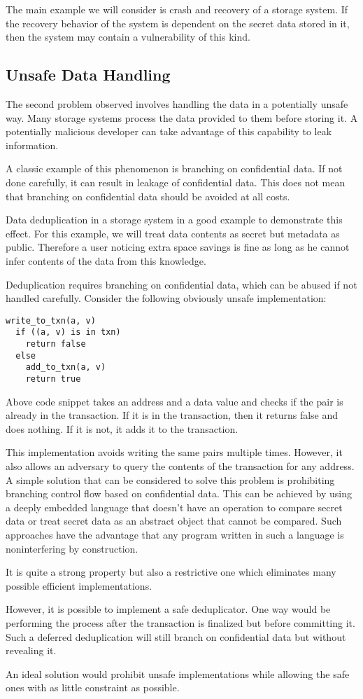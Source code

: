 The main example we will consider is crash and recovery of a storage system. If the recovery behavior of the system is dependent on the secret data stored in it, then the system may contain a vulnerability of this kind.


\subsection{Unsafe Data Handling}
The second problem observed involves handling the data in a potentially unsafe way. Many storage systems process the data provided to them before storing it. A potentially malicious developer can take advantage of this capability to leak information. 

A classic example of this phenomenon is branching on confidential data. If not done carefully, it can result in leakage of confidential data. This does not mean that branching on confidential data should be avoided at all costs. 

Data deduplication in a storage system in a good example to demonstrate this effect. For this example, we will treat data contents as secret but metadata as public. Therefore a user noticing extra space savings is fine as long as he cannot infer contents of the data from this knowledge. 

Deduplication requires branching on confidential data, which can be abused if not handled carefully. Consider the following obviously unsafe implementation: 

\begin{lstlisting}
write_to_txn(a, v)
  if ((a, v) is in txn)
    return false
  else
    add_to_txn(a, v)
    return true
\end{lstlisting}

Above code snippet takes an address and a data value and checks if the pair is already in the transaction. If it is in the transaction, then it returns false and does nothing. If it is not, it adds it to the transaction. 

This implementation avoids writing the same pairs multiple times. However, it also allows an adversary to query the contents of the transaction for any address. A simple solution that can be considered to solve this problem is prohibiting branching control flow based on confidential data. This can be achieved by using a deeply embedded language that doesn’t have an operation to compare secret data or treat secret data as an abstract object that cannot be compared. Such approaches have the advantage that any program written in such a language is noninterfering by construction. 

It is quite a strong property but also a restrictive one which eliminates many possible efficient implementations. 

However, it is possible to implement a safe deduplicator. One way would be performing the process after the transaction is finalized but before committing it. Such a deferred deduplication will still branch on confidential data but without revealing it. 

An ideal solution would prohibit unsafe implementations while allowing the safe ones with as little constraint as possible. 